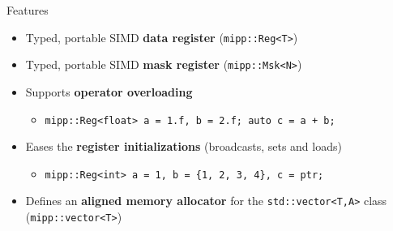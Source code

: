 \begin{frame}[fragile]{Features}
  \vfill
  \begin{itemize}
    \item \textcolor{Paired-5}{Typed}, portable SIMD \textbf{data register} (\texttt{mipp::Reg<\textcolor{Paired-1}{T}>})
    \vspace{0.2cm}
    \item \textcolor{Paired-5}{Typed}, portable SIMD \textbf{mask register} (\texttt{mipp::Msk<\textcolor{Paired-1}{N}>})
    \vspace{0.2cm}
    \item Supports \textcolor{Paired-5}{\textbf{operator overloading}}
    \begin{itemize}
      \item \texttt{mipp::Reg<\textcolor{Paired-1}{float}> a = 1.f, b = 2.f; \textcolor{Paired-1}{auto} c = a + b;}
    \end{itemize}
    \vspace{0.2cm}
    \item Eases the \textcolor{Paired-5}{\textbf{register initializations}} (broadcasts, sets and loads)
    \begin{itemize}
      \item \texttt{mipp::Reg<\textcolor{Paired-1}{int}> a = 1, b = \{1, 2, 3, 4\}, c = ptr;}
    \end{itemize}
    \vspace{0.2cm}
    \item Defines an \textbf{aligned memory allocator} for the \texttt{std::vector<\textcolor{Paired-1}{T},\textcolor{Paired-1}{A}>} class (\texttt{mipp::vector<\textcolor{Paired-1}{T}>})
  \end{itemize}
  \vfill
\end{frame}

